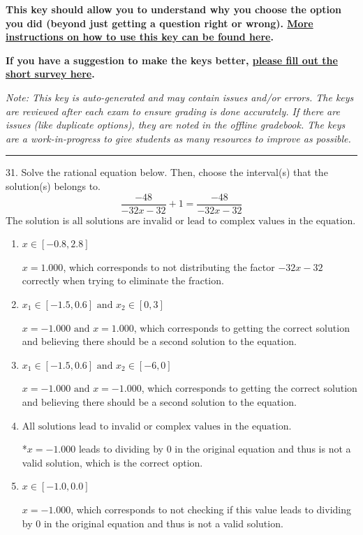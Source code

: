 \documentclass{article}[14pt]
\begin{document}
\textbf{This key should allow you to understand why you choose the option you did (beyond just getting a question right or wrong). \href{https://xronos.clas.ufl.edu/mac1105spring2020/courseDescriptionAndMisc/Exams/LearningFromResults}{More instructions on how to use this key can be found here}.}

\textbf{If you have a suggestion to make the keys better, \href{https://forms.gle/CZkbZmPbC9XALEE88}{please fill out the short survey here}.}

\textit{Note: This key is auto-generated and may contain issues and/or errors. The keys are reviewed after each exam to ensure grading is done accurately. If there are issues (like duplicate options), they are noted in the offline gradebook. The keys are a work-in-progress to give students as many resources to improve as possible.}

\rule{\textwidth}{0.4pt}

31. Solve the rational equation below. Then, choose the interval(s) that the solution(s) belongs to.
$$ \frac{-48}{-32x -32} + 1 = \frac{-48}{-32x -32} $$ 
The solution is $ \text{all solutions are invalid or lead to complex values in the equation.} $ 

\begin{enumerate}[label=\Alph*.] 
\item $ x \in [-0.8,2.8] $ 

 $x = 1.000$, which corresponds to not distributing the factor $-32x -32$ correctly when trying to eliminate the fraction. 
\item $ x_1 \in [-1.5, 0.6] \text{ and } x_2 \in [0,3] $ 

 $x = -1.000 \text{ and } x = 1.000$, which corresponds to getting the correct solution and believing there should be a second solution to the equation. 
\item $ x_1 \in [-1.5, 0.6] \text{ and } x_2 \in [-6,0] $ 

 $x = -1.000 \text{ and } x = -1.000$, which corresponds to getting the correct solution and believing there should be a second solution to the equation. 
\item $ \text{All solutions lead to invalid or complex values in the equation.} $ 

 *$x = -1.000$ leads to dividing by 0 in the original equation and thus is not a valid solution, which is the correct option. 
\item $ x \in [-1.0,0.0] $ 

 $x = -1.000$, which corresponds to not checking if this value leads to dividing by 0 in the original equation and thus is not a valid solution. 
\end{enumerate} 
 
\end{document}
